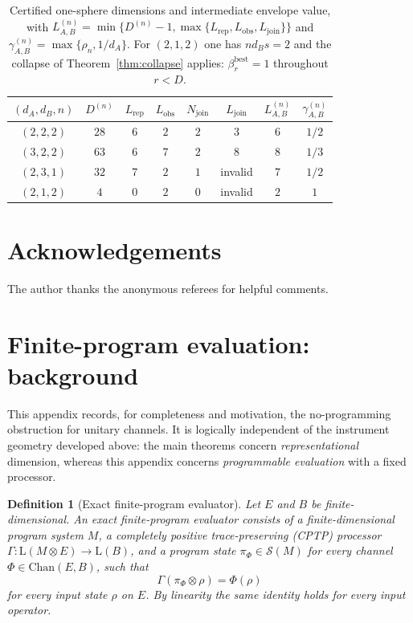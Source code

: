 \documentclass[11pt,a4paper]{article}
\newtheorem{definition}[theorem]{Definition}
\newcommand{\Lin}{\mathrm{L}}
\newcommand{\Sstate}{\mathcal{S}}
\newcommand{\Chan}{\mathrm{Chan}}
\begin{document}
\begin{table}[t]
\centering
\small
\setlength{\tabcolsep}{4pt}
\begin{tabular}{cccccccc}
\toprule
$(d_A,d_B,n)$ & $D^{(n)}$ & $L_{\mathrm{rep}}$ & $L_{\mathrm{obs}}$ & $N_{\mathrm{join}}$ & $L_{\mathrm{join}}$ & $L_{A,B}^{(n)}$ & $\gamma_{A,B}^{(n)}$\\
\midrule
$(2,2,2)$ & $28$ & $6$ & $2$ & $2$ & $3$ & $6$ & $1/2$\\
$(3,2,2)$ & $63$ & $6$ & $7$ & $2$ & $8$ & $8$ & $1/3$\\
$(2,3,1)$ & $32$ & $7$ & $2$ & $1$ & invalid & $7$ & $1/2$\\
$(2,1,2)$ & $4$  & $0$ & $2$ & $0$ & invalid & $2$ & $1$\\
\bottomrule
\end{tabular}
\caption{Certified one-sphere dimensions and intermediate envelope value, with $L_{A,B}^{(n)}=\min\{D^{(n)}-1,\max\{L_{\mathrm{rep}},L_{\mathrm{obs}},L_{\mathrm{join}}\}\}$ and $\gamma_{A,B}^{(n)}=\max\{\rho_n,1/d_A\}$. For $(2,1,2)$ one has $nd_Bs=2$ and the collapse of Theorem~\ref{thm:collapse} applies: $\beta_r^{\mathrm{best}}=1$ throughout $r<D$.}
\label{tab:thresholds}
\end{table}

\section*{Acknowledgements}
The author thanks the anonymous referees for helpful comments.

\appendix

\section{Finite-program evaluation: background}
\label{app:no-programming}

This appendix records, for completeness and motivation, the no-programming obstruction for unitary channels. It is logically independent of the instrument geometry developed above: the main theorems concern \emph{representational} dimension, whereas this appendix concerns \emph{programmable evaluation} with a fixed processor.

\begin{definition}[Exact finite-program evaluator]
Let $E$ and $B$ be finite-dimensional. An exact finite-program evaluator consists of a finite-dimensional program system $M$, a completely positive trace-preserving (CPTP) processor $\Gamma:\Lin(M\otimes E)\to\Lin(B)$, and a program state $\pi_\Phi\in\Sstate(M)$ for every channel $\Phi\in\Chan(E,B)$, such that
\[
\Gamma(\pi_\Phi\otimes\rho)=\Phi(\rho)
\]
for every input state $\rho$ on $E$. By linearity the same identity holds for every input operator.
\end{definition}
\end{document}
